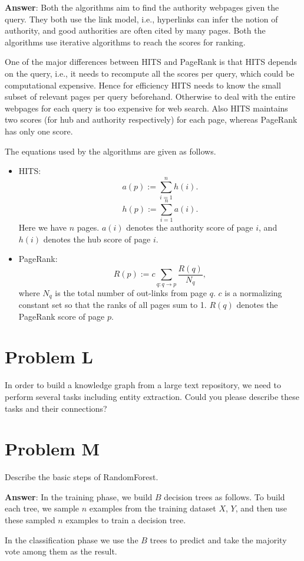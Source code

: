 \documentclass{article}
\begin{document}
{\bf Answer}:
Both the algorithms aim to find the authority webpages given the query. They both use the link model, i.e., hyperlinks can infer the notion of authority, and good authorities are often cited by many pages. Both the algorithms use iterative algorithms to reach the scores for ranking.

One of the major differences between HITS and PageRank is that HITS depends on the query, i.e., it needs to recompute all the scores per query, which could be computational expensive. Hence for efficiency HITS needs to know the small subset of relevant pages per query beforehand. Otherwise to deal with the entire webpages for each query is too expensive for web search. Also HITS maintains two scores (for hub and authority respectively) for each page, whereas PageRank has only one score. 

The equations used by the algorithms are given as follows.
\begin{itemize}
\item HITS:
$$a(p) := \sum_{i=1}^n h(i).$$
$$h(p) := \sum_{i=1}^n a(i).$$
Here we have $n$ pages. $a(i)$ denotes the authority score of page $i$, and $h(i)$ denotes the hub score of page $i$.

\item PageRank:
$$R(p) := c \sum_{q: q \to p} \frac{R(q)}{N_q},$$
where $N_q$ is the total number of out-links from page $q$. $c$ is a normalizing constant set so that the ranks of all pages sum to 1. $R(q)$ denotes the PageRank score of page $p$.
\end{itemize}

\section{Problem L}
In order to build a knowledge graph from a large text repository, we need to perform several tasks including entity extraction. Could you please describe these tasks and their connections?

\section{Problem M}
Describe the basic steps of RandomForest.

{\bf Answer}:
In the training phase, we build $B$ decision trees as follows. To build each tree, we sample $n$ examples from the training dataset $X$, $Y$, and then use these sampled $n$ examples to train a decision tree.

In the classification phase we use the $B$ trees to predict and take the majority vote among them as the result.
\end{document}
